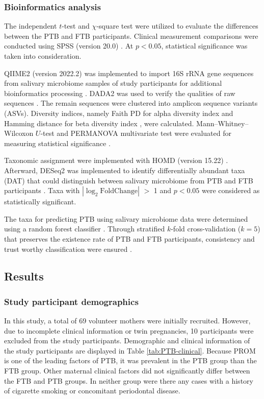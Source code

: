\documentclass[11pt, a4paper, onecolumn, oneside]{report}
\begin{document}
            \subsubsection{Bioinformatics analysis}
                The independent $t$-test and $\chi$-square test were utilized to evaluate the differences between the PTB and FTB participants. Clinical measurement comparisons were conducted using SPSS (version 20.0) \cite{SPSS-1}. At $p < 0.05$, statistical significance was taken into consideration.

                QIIME2 (version 2022.2) was implemented to import 16S rRNA gene sequences from salivary microbiome samples of study participants for additional bioinformatics processing \cite{QIIME2-1}. DADA2 was used to verify the qualities of raw sequences \cite{DADA2-1}. The remain sequences were clustered into amplicon sequence variants (ASVs). Diversity indices, namely Faith PD for alpha diversity index \cite{FaithPD-1} and Hamming distance for beta diversity index \cite{Hamming-1}, were calculated. Mann–Whitney–Wilcoxon $U$-test and PERMANOVA multivariate test were evaluated for measuring statistical significance \cite{PERMANOVA-1, PERMANOVA-2}.

                Taxonomic assignment were implemented with HOMD (version 15.22) \cite{HOMD-1}. Afterward, DESeq2 was implemented to identify differentially abundant taxa (DAT) that could distinguish between salivary microbiome from PTB and FTB participants \cite{DESeq2-1}. Taxa with $| \log _2 \textrm{FoldChange} |$ $>$ 1 and $p < 0.05$ were considered as statistically significant.

                The taxa for predicting PTB using salivary microbiome data were determined using a random forest classifier \cite{RF-1}. Through stratified $k$-fold cross-validation ($k=5$) that preserves the existence rate of PTB and FTB participants, consistency and trust worthy classification were ensured \cite{Kfold-1}.
        \newpage

        \subsection{Results}
            \subsubsection{Study participant demographics}
                In this study, a total of 69 volunteer mothers were initially recruited. However, due to incomplete clinical information or twin pregnancies, 10 participants were excluded from the study participants. Demographic and clinical information of the study participants are displayed in Table \ref{tab:PTB-clinical}. Because PROM is one of the leading factors of PTB, it was prevalent in the PTB group than the FTB group. Other maternal clinical factors did not significantly differ between the FTB and PTB groups. In neither group were there any cases with a history of cigarette smoking or concomitant periodontal disease.
\end{document}
